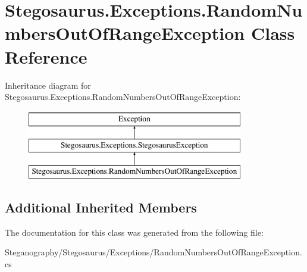 \hypertarget{class_stegosaurus_1_1_exceptions_1_1_random_numbers_out_of_range_exception}{}\section{Stegosaurus.\+Exceptions.\+Random\+Numbers\+Out\+Of\+Range\+Exception Class Reference}
\label{class_stegosaurus_1_1_exceptions_1_1_random_numbers_out_of_range_exception}
Inheritance diagram for Stegosaurus.\+Exceptions.\+Random\+Numbers\+Out\+Of\+Range\+Exception\+:\begin{figure}[H]
\begin{center}
\leavevmode
\includegraphics[height=3.000000cm]{class_stegosaurus_1_1_exceptions_1_1_random_numbers_out_of_range_exception}
\end{center}
\end{figure}
\subsection*{Additional Inherited Members}


The documentation for this class was generated from the following file\+:\begin{DoxyCompactItemize}
\item 
Steganography/\+Stegosaurus/\+Exceptions/Random\+Numbers\+Out\+Of\+Range\+Exception.\+cs\end{DoxyCompactItemize}

